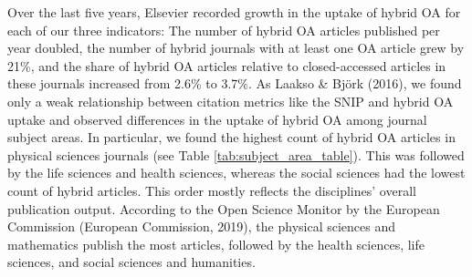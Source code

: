 \documentclass[a4paper,man,floatsintext,longtable,noextraspace,12pt]{apa6}
\begin{document}
Over the last five years, Elsevier recorded growth in the uptake of
hybrid OA for each of our three indicators: The number of hybrid OA
articles published per year doubled, the number of hybrid journals with
at least one OA article grew by 21\%, and the share of hybrid OA
articles relative to closed-accessed articles in these journals
increased from 2.6\% to 3.7\%. As Laakso \& Björk (2016), we found only
a weak relationship between citation metrics like the SNIP and hybrid OA
uptake and observed differences in the uptake of hybrid OA among journal
subject areas. In particular, we found the highest count of hybrid OA
articles in physical sciences journals (see Table
\ref{tab:subject_area_table}). This was followed by the life sciences
and health sciences, whereas the social sciences had the lowest count of
hybrid articles. This order mostly reflects the disciplines' overall
publication output. According to the Open Science Monitor by the
European Commission (European Commission, 2019), the physical sciences
and mathematics publish the most articles, followed by the health
sciences, life sciences, and social sciences and humanities.
\end{document}
